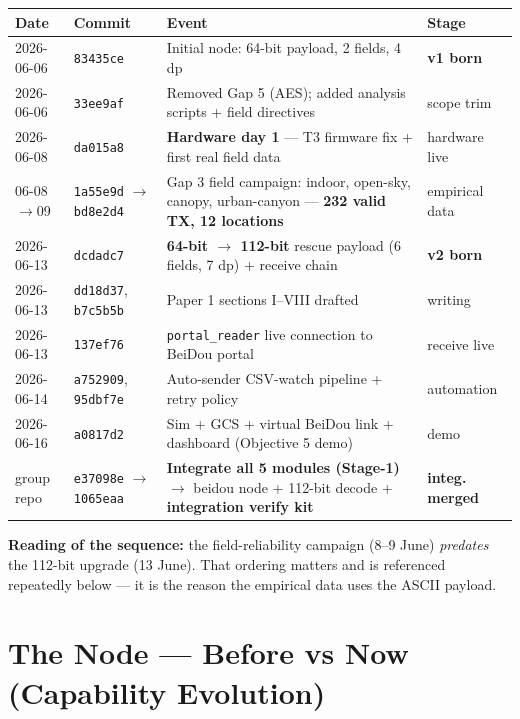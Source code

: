 \documentclass[11pt,a4paper]{article}
\begin{document}
{\small
\begin{longtable}{@{}p{2.0cm} p{2.5cm} p{6.4cm} p{2.2cm}@{}}
\toprule
\textbf{Date} & \textbf{Commit} & \textbf{Event} & \textbf{Stage} \\
\midrule
\endhead
2026-06-06 & \texttt{83435ce} & Initial node: 64-bit payload, 2 fields, 4 dp & \textbf{v1 born} \\
2026-06-06 & \texttt{33ee9af} & Removed Gap 5 (AES); added analysis scripts + field directives & scope trim \\
2026-06-08 & \texttt{da015a8} & \textbf{Hardware day 1} --- T3 firmware fix + first real field data & hardware live \\
06-08$\to$09 & \texttt{1a55e9d} $\to$ \texttt{bd8e2d4} & Gap 3 field campaign: indoor, open-sky, canopy, urban-canyon --- \textbf{232 valid TX, 12 locations} & empirical data \\
2026-06-13 & \texttt{dcdadc7} & \textbf{64-bit $\to$ 112-bit} rescue payload (6 fields, 7 dp) + receive chain & \textbf{v2 born} \\
2026-06-13 & \texttt{dd18d37}, \texttt{b7c5b5b} & Paper 1 sections I--VIII drafted & writing \\
2026-06-13 & \texttt{137ef76} & \texttt{portal\_reader} live connection to BeiDou portal & receive live \\
2026-06-14 & \texttt{a752909}, \texttt{95dbf7e} & Auto-sender CSV-watch pipeline + retry policy & automation \\
2026-06-16 & \texttt{a0817d2} & Sim + GCS + virtual BeiDou link + dashboard (Objective 5 demo) & demo \\
group repo & \texttt{e37098e} $\to$ \texttt{1065eaa} & \textbf{Integrate all 5 modules (Stage-1)} $\to$ beidou node + 112-bit decode + \textbf{integration verify kit} & \textbf{integ. merged} \\
\bottomrule
\end{longtable}
}

\textbf{Reading of the sequence:} the field-reliability campaign (8--9 June)
\emph{predates} the 112-bit upgrade (13 June). That ordering matters and is referenced
repeatedly below --- it is the reason the empirical data uses the ASCII payload.

\section{The Node --- Before vs Now (Capability Evolution)}
\end{document}
